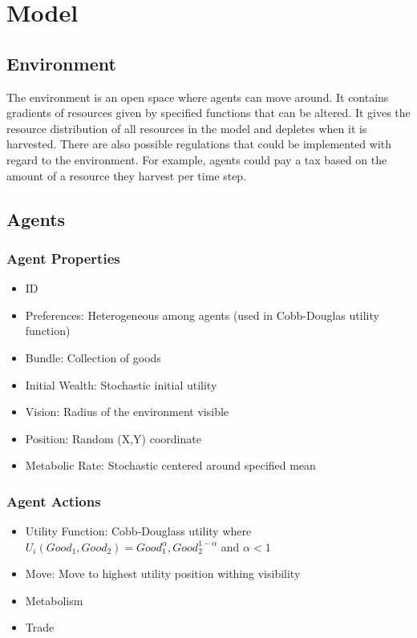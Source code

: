 \documentclass{article}
\begin{document}
\section{Model}

\subsection{Environment}
The environment is an open space where agents can move around. It contains gradients of resources given by specified functions that can be altered. It gives the resource distribution of all resources in the model and depletes when it is harvested. There are also possible regulations that could be implemented with regard to the environment. For example, agents could pay a tax based on the amount of a resource they harvest per time step.

\subsection{Agents}

\subsubsection{Agent Properties}
\begin{itemize}
    \item ID
    \item Preferences: Heterogeneous among agents (used in Cobb-Douglas utility function)
    \item Bundle: Collection of goods
    \item Initial Wealth: Stochastic initial utility
    \item Vision: Radius of the environment visible
    \item Position: Random (X,Y) coordinate
    \item Metabolic Rate: Stochastic centered around specified mean
\end{itemize}

\subsubsection{Agent Actions}
\begin{itemize}
    \item Utility Function: Cobb-Douglass utility where $U_i(Good_1, Good_2) = Good_1^{\alpha}, Good_2^{1-\alpha}$ and $\alpha < 1$
    \item Move: Move to highest utility position withing visibility
    \item Metabolism
    \item Trade
\end{itemize}
\end{document}
